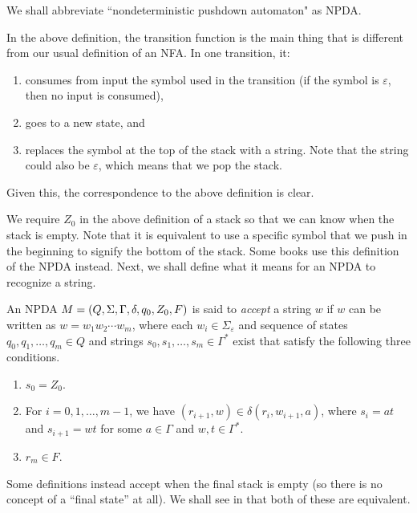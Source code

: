 \vspace{2mm}
We shall abbreviate ``nondeterministic pushdown automaton" as NPDA.

In the above definition, the transition function is the main thing that is different from our usual definition of an NFA. In one transition, it:
\begin{enumerate}
    \item consumes from input the symbol used in the transition (if the symbol is $\varepsilon$, then no input is consumed),
    \item goes to a new state, and
    \item replaces the symbol at the top of the stack with a string. Note that the string could also be $\varepsilon$, which means that we pop the stack.
\end{enumerate}
Given this, the correspondence to the above definition is clear.

We require $Z_0$ in the above definition of a stack so that we can know when the stack is empty. Note that it is equivalent to use a specific symbol that we push in the beginning to signify the bottom of the stack. Some books use this definition of the NPDA instead. Next, we shall define what it means for an NPDA to recognize a string.

\begin{definition}
An NPDA $M=(Q,\Sigma,\Gamma,\delta,q_0,Z_0,F)$ is said to \textit{accept} a string $w$ if $w$ can be written as $w=w_1w_2\cdots w_m$, where each $w_i\in\Sigma_\varepsilon$ and sequence of states $q_0,q_1,\ldots,q_m\in Q$ and strings $s_0,s_1,\ldots,s_m\in\Gamma^*$ exist that satisfy the following three conditions.
\begin{enumerate}
    \item $s_0=Z_0$.
    \item For $i=0,1,\ldots,m-1$, we have $(r_{i+1},w)\in\delta(r_i,w_{i+1},a)$, where $s_i=at$ and $s_{i+1}=wt$ for some $a\in\Gamma$ and $w,t\in\Gamma^*$.
    \item $r_m\in F$.
\end{enumerate}
\end{definition}

Some definitions instead accept when the final stack is empty (so there is no concept of a ``final state'' at all). We shall see in  that both of these are equivalent.

